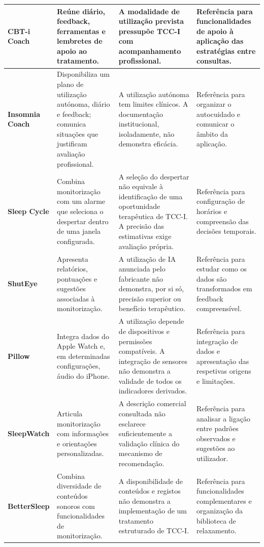 \begin{xltabular}{\textwidth}{@{} 
		>{\raggedright\arraybackslash}p{2.2cm} 
		>{\raggedright\arraybackslash}X 
		>{\raggedright\arraybackslash}X 
		>{\raggedright\arraybackslash}p{3.2cm} @{}}
	\textbf{CBT-i Coach} & Reúne diário, feedback, ferramentas e lembretes de apoio ao tratamento. & A modalidade de utilização prevista pressupõe TCC-I com acompanhamento profissional. & Referência para funcionalidades de apoio à aplicação das estratégias entre consultas. \\ \midrule
	
	\textbf{Insomnia Coach} & Disponibiliza um plano de utilização autónoma, diário e feedback; comunica situações que justificam avaliação profissional. & A utilização autónoma tem limites clínicos. A documentação institucional, isoladamente, não demonstra eficácia. & Referência para organizar o autocuidado e comunicar o âmbito da aplicação. \\ \midrule
	
	\textbf{Sleep Cycle} & Combina monitorização com um alarme que seleciona o despertar dentro de uma janela configurada. & A seleção do despertar não equivale à identificação de uma oportunidade terapêutica de TCC-I. A precisão das estimativas exige avaliação própria. & Referência para configuração de horários e compreensão das decisões temporais. \\ \midrule
	
	\textbf{ShutEye} & Apresenta relatórios, pontuações e sugestões associadas à monitorização. & A utilização de IA anunciada pelo fabricante não demonstra, por si só, precisão superior ou benefício terapêutico. & Referência para estudar como os dados são transformados em feedback compreensível. \\ \midrule
	
	\textbf{Pillow} & Integra dados do Apple Watch e, em determinadas configurações, áudio do iPhone. & A utilização depende de dispositivos e permissões compatíveis. A integração de sensores não demonstra a validade de todos os indicadores derivados. & Referência para integração de dados e apresentação das respetivas origens e limitações. \\ \midrule
	
	\textbf{SleepWatch} & Articula monitorização com informações e orientações personalizadas. & A descrição comercial consultada não esclarece suficientemente a validação clínica do mecanismo de recomendação. & Referência para analisar a ligação entre padrões observados e sugestões ao utilizador. \\ \midrule
	
	\textbf{BetterSleep} & Combina diversidade de conteúdos sonoros com funcionalidades de monitorização. & A disponibilidade de conteúdos e registos não demonstra a implementação de um tratamento estruturado de TCC-I. & Referência para funcionalidades complementares e organização da biblioteca de relaxamento. \\ \midrule
	

\end{xltabular}
